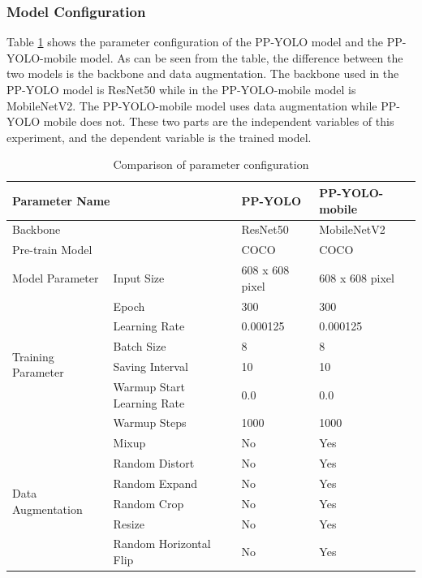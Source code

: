 \documentclass[sensors,article,submit,moreauthors,pdftex]{Definitions/mdpi}
\begin{document}
\subsubsection{Model Configuration}

Table \ref{tbl:Parameter} shows the parameter configuration of the PP-YOLO model and the PP-YOLO-mobile model. As can be seen from the table, the difference between the two models is the backbone and data augmentation. The backbone used in the PP-YOLO model is ResNet50 while in the PP-YOLO-mobile model is MobileNetV2. The PP-YOLO-mobile model uses data augmentation while PP-YOLO mobile does not. These two parts are the independent variables of this experiment, and the dependent variable is the trained model.

\begin{table}[htbp]
\centering
\caption{Comparison of parameter configuration}
\begin{tabular}{llll} 
\toprule
\multicolumn{2}{l}{\textbf{Parameter Name}}&\textbf{PP-YOLO}&\textbf{PP-YOLO-mobile}\\
\midrule
\multicolumn{2}{l}{Backbone} & ResNet50 & MobileNetV2 \\
\multicolumn{2}{l}{Pre-train Model} & COCO & COCO \\
\cmidrule(r){1-4}

\multirow{1}{*}{Model Parameter} 
& Input Size & 608 x 608 pixel  & 608 x 608 pixel  \\
\cmidrule(r){1-4}

\multirow{6}{*}{Training Parameter} 
& Epoch& 300  & 300  \\
& Learning Rate & 0.000125 & 0.000125  \\
& Batch Size & 8 & 8 \\
& Saving Interval & 10 & 10 \\
& Warmup Start Learning Rate & 0.0 & 0.0 \\
& Warmup Steps & 1000 & 1000 \\
\cmidrule(r){1-4}

\multirow{6}{*}{Data Augmentation} 
& Mixup& No  & Yes  \\
& Random Distort & No & Yes  \\
& Random Expand & No & Yes \\
& Random Crop  & No & Yes \\
& Resize & No & Yes \\
& Random Horizontal Flip & No & Yes \\

\bottomrule
\end{tabular}
\label{tbl:Parameter}
\end{table}
\end{document}

